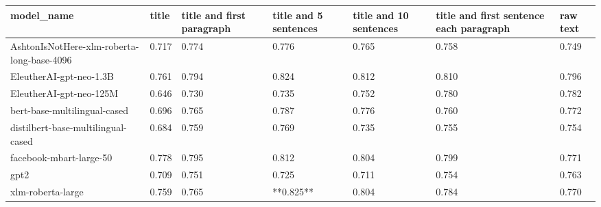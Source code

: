 \begin{tabular}{lllllll}
\toprule
                                model\_name & title & title and first paragraph & title and 5 sentences & title and 10 sentences & title and first sentence each paragraph & raw text \\
\midrule
AshtonIsNotHere-xlm-roberta-long-base-4096 & 0.717 &                     0.774 &                 0.776 &                  0.765 &                                   0.758 &    0.749 \\
                   EleutherAI-gpt-neo-1.3B & 0.761 &                     0.794 &                 0.824 &                  0.812 &                                   0.810 &    0.796 \\
                   EleutherAI-gpt-neo-125M & 0.646 &                     0.730 &                 0.735 &                  0.752 &                                   0.780 &    0.782 \\
              bert-base-multilingual-cased & 0.696 &                     0.765 &                 0.787 &                  0.776 &                                   0.760 &    0.772 \\
        distilbert-base-multilingual-cased & 0.684 &                     0.759 &                 0.769 &                  0.735 &                                   0.755 &    0.754 \\
                   facebook-mbart-large-50 & 0.778 &                     0.795 &                 0.812 &                  0.804 &                                   0.799 &    0.771 \\
                                      gpt2 & 0.709 &                     0.751 &                 0.725 &                  0.711 &                                   0.754 &    0.763 \\
                         xlm-roberta-large & 0.759 &                     0.765 &             **0.825** &                  0.804 &                                   0.784 &    0.770 \\
\bottomrule
\end{tabular}
